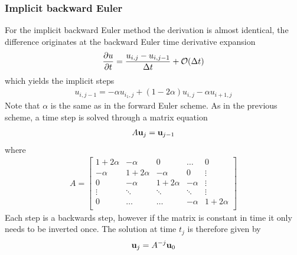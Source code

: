 \documentclass[aps,reprint]{revtex4-1}
\newcommand{\bigO}[1]{\ensuremath{\mathop{}\mathopen{}\mathcal{O}\mathopen{}\left(#1\right)}}
\begin{document}
\subsubsection{Implicit backward Euler}
For the implicit backward Euler method the derivation is almost identical,
the difference originates at the backward Euler time derivative expansion
\begin{align*}
  \pdv{u}{t} = \frac{u_{i,j} - u_{i,j-1}}{\Delta{t}} + \bigO{\Delta{t}}
\end{align*}
which yields the implicit steps
\begin{align*}
  u_{i,j-1} = -\alpha u_{i_1,j} + (1-2\alpha) u_{i,j} - \alpha u_{i+1,j}
\end{align*}
Note that $\alpha$ is the same as in the forward Euler scheme. As in the previous
scheme, a time step is solved through a matrix equation
\begin{align*}
  A \vb{u}_{j} = \vb{u}_{j-1}
\end{align*}
where
\begin{align*}
  A = \begin{bmatrix}
        1 + 2\alpha & -\alpha      & 0            & \hdots  & 0      \\
        -\alpha      & 1 + 2\alpha & -\alpha       & 0       & \vdots \\
        0           & -\alpha      & 1 + 2\alpha  & -\alpha  & \vdots \\
        \vdots      & \ddots      & \ddots       & \ddots  & \vdots \\
        0           & \hdots      & \hdots       & -\alpha  & 1 + 2\alpha \\
      \end{bmatrix}
\end{align*}
Each step is a backwards step, however if the matrix is constant in time it only
needs to be inverted once. The solution at time $t_j$ is therefore given by
\begin{align*}
  \vb{u}_j = A^{-j} \vb{u}_0
\end{align*}
\end{document}
